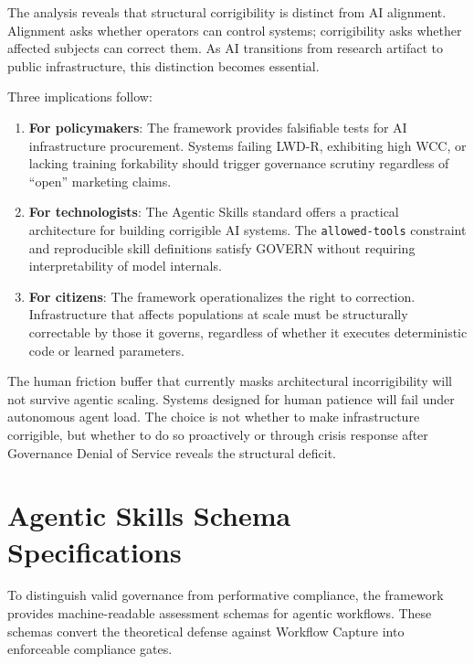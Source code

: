 \documentclass[11pt,a4paper]{article}
\theoremstyle{definition}
\begin{document}
The analysis reveals that structural corrigibility is distinct from AI alignment. Alignment asks whether operators can control systems; corrigibility asks whether affected subjects can correct them. As AI transitions from research artifact to public infrastructure, this distinction becomes essential.

Three implications follow:

\begin{enumerate}[noitemsep]
    \item \textbf{For policymakers}: The framework provides falsifiable tests for AI infrastructure procurement. Systems failing LWD-R, exhibiting high WCC, or lacking training forkability should trigger governance scrutiny regardless of ``open'' marketing claims.

    \item \textbf{For technologists}: The Agentic Skills standard \citep{agentskills2025} offers a practical architecture for building corrigible AI systems. The \texttt{allowed-tools} constraint and reproducible skill definitions satisfy GOVERN without requiring interpretability of model internals.

    \item \textbf{For citizens}: The framework operationalizes the right to correction. Infrastructure that affects populations at scale must be structurally correctable by those it governs, regardless of whether it executes deterministic code or learned parameters.
\end{enumerate}

The human friction buffer that currently masks architectural incorrigibility will not survive agentic scaling. Systems designed for human patience will fail under autonomous agent load. The choice is not whether to make infrastructure corrigible, but whether to do so proactively or through crisis response after Governance Denial of Service reveals the structural deficit.


\appendix

\section{Agentic Skills Schema Specifications}
\label{appendix:agentic-schema}

To distinguish valid governance from performative compliance, the framework provides machine-readable assessment schemas for agentic workflows. These schemas convert the theoretical defense against Workflow Capture into enforceable compliance gates.
\end{document}

